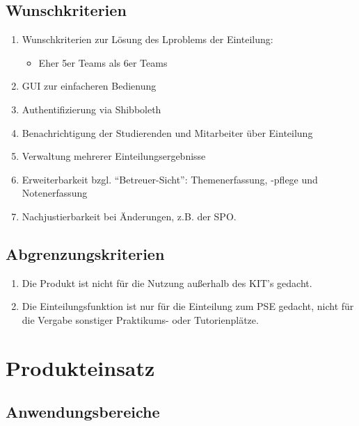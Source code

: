 \documentclass[parskip=full]{scrartcl}
\begin{document}
\subsection{Wunschkriterien}
\begin{enumerate}[{W}1]
\item Wunschkriterien zur Lösung des Lproblems der Einteilung:
    \begin{itemize}
      \item Eher 5er Teams als 6er Teams
    \end{itemize}
    \item GUI zur einfacheren Bedienung
    
\item Authentifizierung via Shibboleth

\item Benachrichtigung der Studierenden und Mitarbeiter über Einteilung

\item Verwaltung mehrerer Einteilungsergebnisse

\item  Erweiterbarkeit bzgl. “Betreuer-Sicht”: Themenerfassung, -pflege und
    Notenerfassung
    \item Nachjustierbarkeit bei Änderungen, z.B. der SPO.
\end{enumerate}

\subsection{Abgrenzungskriterien}
\begin{enumerate}[{A}1]
 
  \item Die Produkt ist nicht für die Nutzung außerhalb des KIT's gedacht.

\item Die Einteilungsfunktion ist nur für die Einteilung zum PSE gedacht, nicht
für die Vergabe sonstiger Praktikums- oder Tutorienplätze.
  
\end{enumerate}
\section{Produkteinsatz}

\subsection{Anwendungsbereiche}
\end{document}
